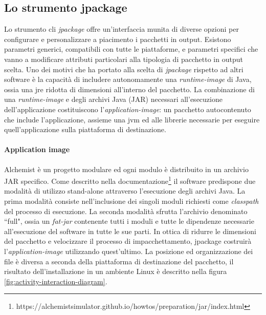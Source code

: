 \subsection{Lo strumento jpackage}\label{sec:design-jpackage}
Lo strumento \ac{cli} \textit{jpackage} offre un'interfaccia munita di diverse opzioni per configurare e personalizzare a piacimento i pacchetti in output. Esistono parametri generici, compatibili con tutte le piattaforme, e parametri specifici che vanno a modificare attributi particolari alla tipologia di pacchetto in output scelta. Uno dei motivi che ha portato alla scelta di \textit{jpackage} rispetto ad altri software è la capacità di includere autonomamente una \textit{runtime-image} di Java, ossia una \ac{jre} ridotta di dimensioni all'interno del pacchetto. La combinazione di una \textit{runtime-image} e degli archivi Java (JAR) necessari all'esecuzione dell'applicazione costituiscono l'\textit{application-image}: un pacchetto autocontenuto che include l'applicazione, assieme una \ac{jvm} ed alle librerie necessarie per eseguire quell'applicazione sulla piattaforma di destinazione.

\paragraph{Application image} Alchemist è un progetto modulare ed ogni modulo è distribuito in un archivio JAR specifico. Come descritto nella documentazione\footnote{https://alchemistsimulator.github.io/howtos/preparation/jar/index.html} il software predispone due modalità di utilizzo stand-alone attraverso l'esecuzione degli archivi Java. La prima modalità consiste nell'inclusione dei singoli moduli richiesti come \textit{classpath} del processo di esecuzione. La seconda modalità sfrutta l'archivio denominato ``full", ossia un \textit{fat-jar} contenente tutti i moduli e tutte le dipendenze necessarie all'esecuzione del software in tutte le sue parti. In ottica di ridurre le dimensioni del pacchetto e velocizzare il processo di impacchettamento, jpackage costruirà l'\textit{application-image} utilizzando quest'ultimo. La posizione ed organizzazione dei file è diversa a seconda della piattaforma di destinazione del pacchetto, il risultato dell'installazione in un ambiente Linux è descritto nella figura \ref{fig:activity-interaction-diagram}.  

